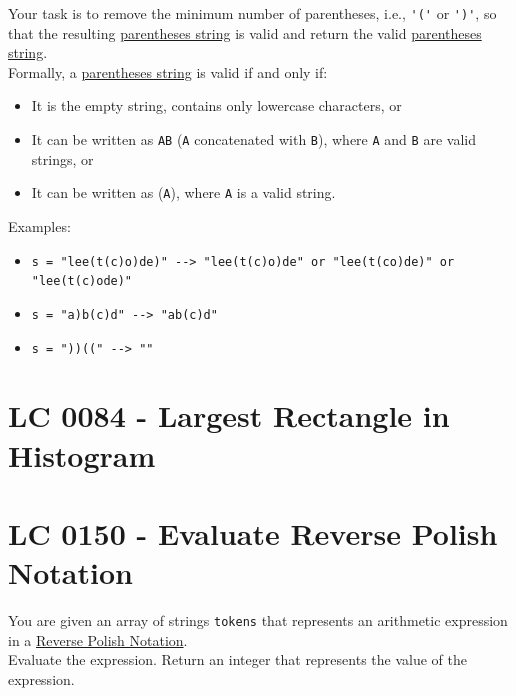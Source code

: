 Your task is to remove the minimum number of parentheses, i.e., {\colorbox{CodeBackground}{\lstinline|'('|}} or {\colorbox{CodeBackground}{\lstinline|')'|}}, so that the resulting \ul{parentheses string} is valid and return the valid \ul{parentheses string}. \\

Formally, a \ul{parentheses string} is valid if and only if:
\begin{itemize}
\item It is the empty string, contains only lowercase characters, or
\item It can be written as {\colorbox{CodeBackground}{\lstinline|AB|}} ({\colorbox{CodeBackground}{\lstinline|A|}} concatenated with {\colorbox{CodeBackground}{\lstinline|B|}}), where {\colorbox{CodeBackground}{\lstinline|A|}} and {\colorbox{CodeBackground}{\lstinline|B|}} are valid  strings, or
\item It can be written as ({\colorbox{CodeBackground}{\lstinline|A|}}), where {\colorbox{CodeBackground}{\lstinline|A|}} is a valid string.
\end{itemize}

Examples:
\begin{itemize}
\item {\colorbox{CodeBackground}{\lstinline|s = "lee(t(c)o)de)" --> "lee(t(c)o)de" or "lee(t(co)de)" or "lee(t(c)ode)"|}}
\item {\colorbox{CodeBackground}{\lstinline|s = "a)b(c)d" --> "ab(c)d"|}}
\item {\colorbox{CodeBackground}{\lstinline|s = "))((" --> ""|}}
\end{itemize}

\section{LC 0084 - Largest Rectangle in Histogram}

\section{LC 0150 - Evaluate Reverse Polish Notation}
You are given an array of strings {\colorbox{CodeBackground}{\lstinline|tokens|}} that represents an arithmetic expression in a \href{https://en.wikipedia.org/wiki/Reverse_Polish_notation}{Reverse Polish Notation}.\\



Evaluate the expression. Return an integer that represents the value of the expression.\\

